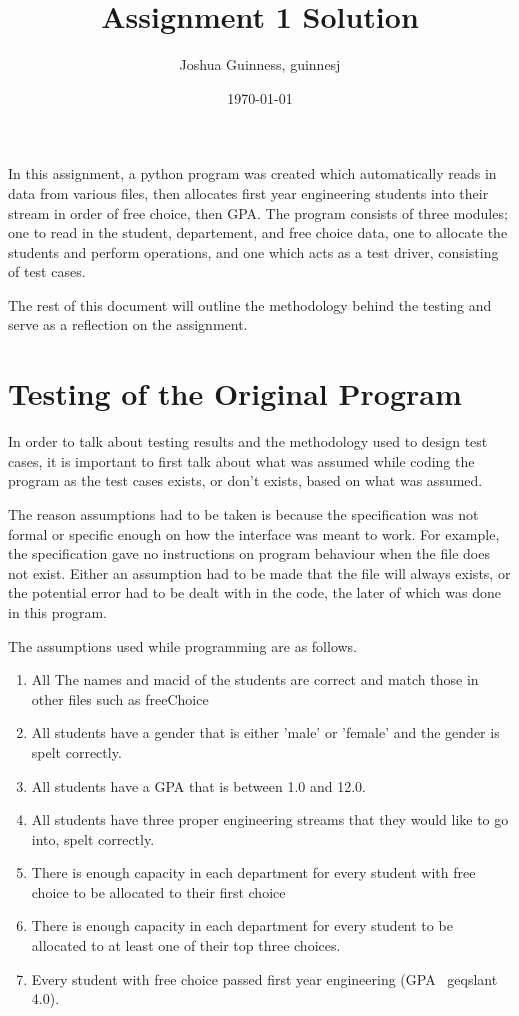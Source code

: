 \documentclass[12pt]{article}
\title{Assignment 1 Solution}
\author{Joshua Guinness, guinnesj}
\date{\today}
\begin{document}
\maketitle

In this assignment, a python program was created which automatically reads in data
from various files, then allocates first year engineering students into their
stream in order of free choice, then GPA. The program consists of three modules; 
one to read in the student, departement, and free choice data, one to allocate
the students and perform operations, and one which acts as a test driver, consisting
of test cases.

The rest of this document will outline the methodology behind the testing
and serve as a reflection on the assignment.

\section{Testing of the Original Program}

In order to talk about testing results and the methodology used to design test cases,
it is important to first talk about what was assumed while coding the program as
the test cases exists, or don't exists, based on what was assumed. 

The reason assumptions had to be taken is because the specification was not formal or
specific enough on how the interface was meant to work. For example, the specification
gave no instructions on program behaviour when the file does not exist. Either
an assumption had to be made that the file will always exists, or the potential
error had to be dealt with in the code, the later of which was done in this program.

The assumptions used while programming are as follows.

\begin{enumerate}
	\item All The names and macid of the students are correct and match those in
	other files such as freeChoice
	\item All students have a gender that is either 'male' or 'female' and the 
	gender is spelt correctly.
	\item All students have a GPA that is between 1.0 and 12.0.
	\item All students have three proper engineering streams that they would like
	to go into, spelt correctly.
	\item There is enough capacity in each department for every student with free choice
	to be allocated to their first choice
	\item There is enough capacity in each department for every student to be allocated
	to at least one of their top three choices.
	\item Every student with free choice passed first year engineering (GPA \
	geqslant 4.0).
\end{enumerate}
\end{document}
